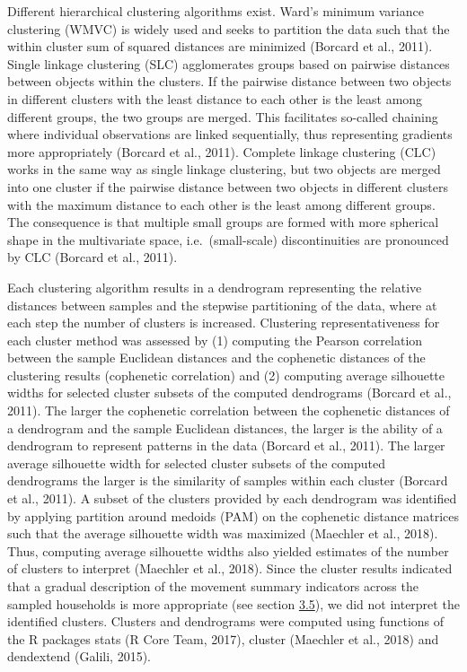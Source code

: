 \documentclass[]{elsarticle} %
\begin{document}
Different hierarchical clustering algorithms exist. Ward's minimum
variance clustering (WMVC) is widely used and seeks to partition the
data such that the within cluster sum of squared distances are minimized
(Borcard et al., 2011). Single linkage clustering (SLC) agglomerates
groups based on pairwise distances between objects within the clusters.
If the pairwise distance between two objects in different clusters with
the least distance to each other is the least among different groups,
the two groups are merged. This facilitates so-called chaining where
individual observations are linked sequentially, thus representing
gradients more appropriately (Borcard et al., 2011). Complete linkage
clustering (CLC) works in the same way as single linkage clustering, but
two objects are merged into one cluster if the pairwise distance between
two objects in different clusters with the maximum distance to each
other is the least among different groups. The consequence is that
multiple small groups are formed with more spherical shape in the
multivariate space, i.e.~(small-scale) discontinuities are pronounced by
CLC (Borcard et al., 2011).

Each clustering algorithm results in a dendrogram representing the
relative distances between samples and the stepwise partitioning of the
data, where at each step the number of clusters is increased. Clustering
representativeness for each cluster method was assessed by (1) computing
the Pearson correlation between the sample Euclidean distances and the
cophenetic distances of the clustering results (cophenetic correlation)
and (2) computing average silhouette widths for selected cluster subsets
of the computed dendrograms (Borcard et al., 2011). The larger the
cophenetic correlation between the cophenetic distances of a dendrogram
and the sample Euclidean distances, the larger is the ability of a
dendrogram to represent patterns in the data (Borcard et al., 2011). The
larger average silhouette width for selected cluster subsets of the
computed dendrograms the larger is the similarity of samples within each
cluster (Borcard et al., 2011). A subset of the clusters provided by
each dendrogram was identified by applying partition around medoids
(PAM) on the cophenetic distance matrices such that the average
silhouette width was maximized (Maechler et al., 2018). Thus, computing
average silhouette widths also yielded estimates of the number of
clusters to interpret (Maechler et al., 2018). Since the cluster results
indicated that a gradual description of the movement summary indicators
across the sampled households is more appropriate (see section
\protect\hyperlink{hierarchical-cluster-analysis-1}{3.5}), we did not
interpret the identified clusters. Clusters and dendrograms were
computed using functions of the R packages stats (R Core Team, 2017),
cluster (Maechler et al., 2018) and dendextend (Galili, 2015).
\end{document}
